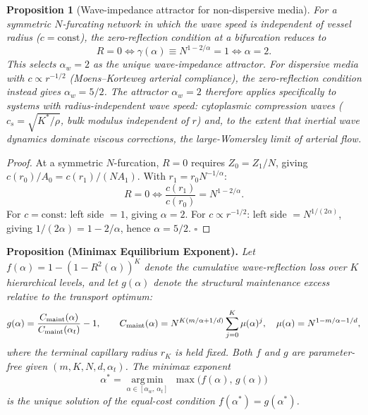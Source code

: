 \documentclass[11pt,a4paper]{article}
\newtheorem{proposition}[theorem]{Proposition}
\theoremstyle{remark}
\begin{document}
\vspace{0.5em}
\begin{proposition}[Wave-impedance attractor for non-dispersive media]
For a symmetric $N$-furcating network in which the wave speed is independent
of vessel radius ($c = \mathrm{const}$), the zero-reflection condition at a
bifurcation reduces to
\begin{equation}
R = 0 \iff \gamma(\alpha) \equiv N^{1-2/\alpha} = 1 \iff \alpha = 2.
\end{equation}
This selects $\alpha_w = 2$ as the unique wave-impedance attractor.
For dispersive media with $c \propto r^{-1/2}$ (Moens--Korteweg arterial
compliance), the zero-reflection condition instead gives $\alpha_w = 5/2$.
The attractor $\alpha_w = 2$ therefore applies specifically to systems
with radius-independent wave speed: cytoplasmic compression waves
($c_s = \sqrt{K^*/\rho}$, bulk modulus independent of $r$) and,
to the extent that inertial wave dynamics dominate viscous corrections,
the large-Womersley limit of arterial flow.
\end{proposition}

\begin{proof}
At a symmetric $N$-furcation, $R = 0$ requires $Z_0 = Z_1/N$, giving
$c(r_0)/A_0 = c(r_1)/(N A_1)$. With $r_1 = r_0 N^{-1/\alpha}$:
\begin{equation}
R = 0 \iff \frac{c(r_1)}{c(r_0)} = N^{1-2/\alpha}.
\end{equation}
For $c = \mathrm{const}$: left side $= 1$, giving $\alpha = 2$.
For $c \propto r^{-1/2}$: left side $= N^{1/(2\alpha)}$, giving
$1/(2\alpha) = 1 - 2/\alpha$, hence $\alpha = 5/2$. $\square$
\end{proof}

\vspace{0.5em}
\noindent\textbf{Proposition (Minimax Equilibrium Exponent).}
\textit{Let $f(\alpha) = 1-(1-R^2(\alpha))^K$ denote the cumulative wave-reflection loss over $K$ hierarchical levels, and let $g(\alpha)$ denote the structural maintenance excess relative to the transport optimum:}
\begin{equation}
g(\alpha) = \frac{C_{\rm maint}(\alpha)}{C_{\rm maint}(\alpha_t)} - 1, \qquad
C_{\rm maint}(\alpha) = N^{K(m/\alpha + 1/d)}\sum_{j=0}^{K} \mu(\alpha)^j,
\quad \mu(\alpha) = N^{1-m/\alpha-1/d},
\end{equation}
\textit{where the terminal capillary radius $r_K$ is held fixed. Both $f$ and $g$ are parameter-free given $(m, K, N, d, \alpha_t)$. The minimax exponent}
\begin{equation}
\alpha^* = \operatorname*{arg\,min}_{\alpha \in [\alpha_w,\,\alpha_t]}\; \max\bigl(f(\alpha),\, g(\alpha)\bigr)
\end{equation}
\textit{is the unique solution of the equal-cost condition $f(\alpha^*) = g(\alpha^*)$.}
\end{document}
